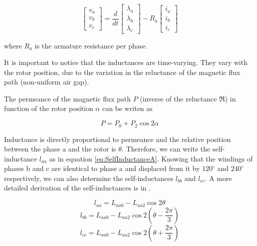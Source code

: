 \begin{equation} \label{eq:VotlageStator}
	\begin{bmatrix}
		v_a \\
		v_b \\
		v_c
	\end{bmatrix}
	=
	\frac{d}{dt}
	\begin{bmatrix}
		\lambda_a \\
		\lambda_b \\
		\lambda_c
	\end{bmatrix}
	-R_a
	\begin{bmatrix}
		i_a \\
		i_b \\
		i_c
	\end{bmatrix}
\end{equation}

where $R_a$ is the armature resistance per phase.

It is important to notice that the inductances are time-varying. They vary with the rotor position, due to the variation in the reluctance of the magnetic flux path (non-uniform air gap). 

The permeance of the magnetic flux path $P$ (inverse of the reluctance $\Re$) in function of the rotor position $\alpha$ can be writen as

\begin{equation}
	P = P_0 + P_2 \cos 2 \alpha
\end{equation}

Inductance is directly proportional to permeance and the relative position between the phase a and the rotor is $\theta$. Therefore, we can write the self-inductance $l_{aa}$ as in equation \ref{eq:SelfInductanceA}. Knowing that the windings of phases b and c are identical to phase a and displaced from it by  $120^{\circ}$ and $240^{\circ}$ respectively, we can also determine the self-inductances $l_{bb}$ and $l_{cc}$. A more detailed derivation of the self-inductances is in \cite{kundur1994power}.

\begin{equation} \label{eq:SelfInductanceA}
	l_{aa} = L_{aa0} - L_{aa2} \cos 2 \theta
\end{equation}
\begin{equation} \label{eq:SelfInductanceB}
	l_{bb} = L_{aa0} - L_{aa2} \cos 2 (\theta - \frac{2 \pi}{3})
\end{equation}
\begin{equation} \label{eq:SelfInductanceC}
	l_{cc} = L_{aa0} - L_{aa2} \cos 2 (\theta + \frac{2 \pi}{3})
\end{equation}

